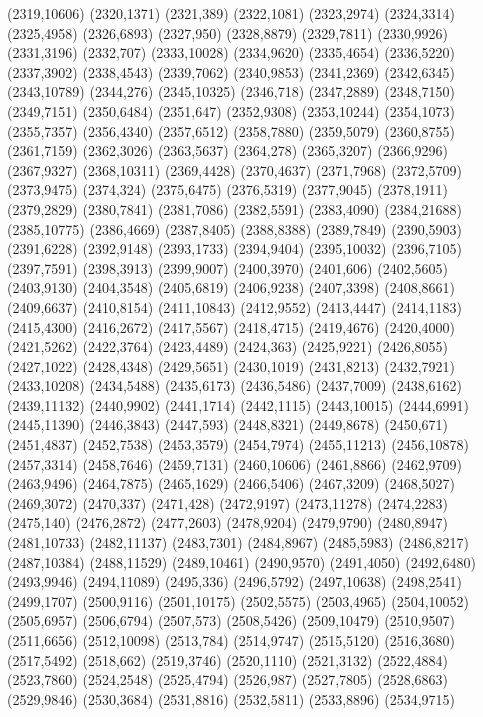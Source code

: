 (2319,10606)
(2320,1371)
(2321,389)
(2322,1081)
(2323,2974)
(2324,3314)
(2325,4958)
(2326,6893)
(2327,950)
(2328,8879)
(2329,7811)
(2330,9926)
(2331,3196)
(2332,707)
(2333,10028)
(2334,9620)
(2335,4654)
(2336,5220)
(2337,3902)
(2338,4543)
(2339,7062)
(2340,9853)
(2341,2369)
(2342,6345)
(2343,10789)
(2344,276)
(2345,10325)
(2346,718)
(2347,2889)
(2348,7150)
(2349,7151)
(2350,6484)
(2351,647)
(2352,9308)
(2353,10244)
(2354,1073)
(2355,7357)
(2356,4340)
(2357,6512)
(2358,7880)
(2359,5079)
(2360,8755)
(2361,7159)
(2362,3026)
(2363,5637)
(2364,278)
(2365,3207)
(2366,9296)
(2367,9327)
(2368,10311)
(2369,4428)
(2370,4637)
(2371,7968)
(2372,5709)
(2373,9475)
(2374,324)
(2375,6475)
(2376,5319)
(2377,9045)
(2378,1911)
(2379,2829)
(2380,7841)
(2381,7086)
(2382,5591)
(2383,4090)
(2384,21688)
(2385,10775)
(2386,4669)
(2387,8405)
(2388,8388)
(2389,7849)
(2390,5903)
(2391,6228)
(2392,9148)
(2393,1733)
(2394,9404)
(2395,10032)
(2396,7105)
(2397,7591)
(2398,3913)
(2399,9007)
(2400,3970)
(2401,606)
(2402,5605)
(2403,9130)
(2404,3548)
(2405,6819)
(2406,9238)
(2407,3398)
(2408,8661)
(2409,6637)
(2410,8154)
(2411,10843)
(2412,9552)
(2413,4447)
(2414,1183)
(2415,4300)
(2416,2672)
(2417,5567)
(2418,4715)
(2419,4676)
(2420,4000)
(2421,5262)
(2422,3764)
(2423,4489)
(2424,363)
(2425,9221)
(2426,8055)
(2427,1022)
(2428,4348)
(2429,5651)
(2430,1019)
(2431,8213)
(2432,7921)
(2433,10208)
(2434,5488)
(2435,6173)
(2436,5486)
(2437,7009)
(2438,6162)
(2439,11132)
(2440,9902)
(2441,1714)
(2442,1115)
(2443,10015)
(2444,6991)
(2445,11390)
(2446,3843)
(2447,593)
(2448,8321)
(2449,8678)
(2450,671)
(2451,4837)
(2452,7538)
(2453,3579)
(2454,7974)
(2455,11213)
(2456,10878)
(2457,3314)
(2458,7646)
(2459,7131)
(2460,10606)
(2461,8866)
(2462,9709)
(2463,9496)
(2464,7875)
(2465,1629)
(2466,5406)
(2467,3209)
(2468,5027)
(2469,3072)
(2470,337)
(2471,428)
(2472,9197)
(2473,11278)
(2474,2283)
(2475,140)
(2476,2872)
(2477,2603)
(2478,9204)
(2479,9790)
(2480,8947)
(2481,10733)
(2482,11137)
(2483,7301)
(2484,8967)
(2485,5983)
(2486,8217)
(2487,10384)
(2488,11529)
(2489,10461)
(2490,9570)
(2491,4050)
(2492,6480)
(2493,9946)
(2494,11089)
(2495,336)
(2496,5792)
(2497,10638)
(2498,2541)
(2499,1707)
(2500,9116)
(2501,10175)
(2502,5575)
(2503,4965)
(2504,10052)
(2505,6957)
(2506,6794)
(2507,573)
(2508,5426)
(2509,10479)
(2510,9507)
(2511,6656)
(2512,10098)
(2513,784)
(2514,9747)
(2515,5120)
(2516,3680)
(2517,5492)
(2518,662)
(2519,3746)
(2520,1110)
(2521,3132)
(2522,4884)
(2523,7860)
(2524,2548)
(2525,4794)
(2526,987)
(2527,7805)
(2528,6863)
(2529,9846)
(2530,3684)
(2531,8816)
(2532,5811)
(2533,8896)
(2534,9715)
